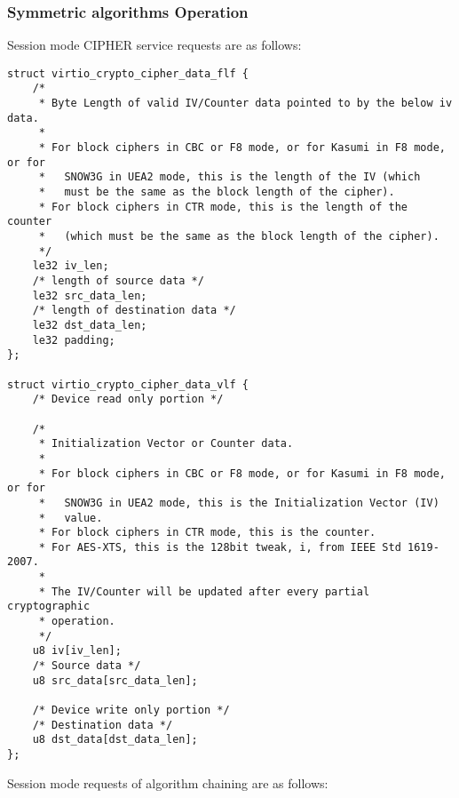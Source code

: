 \subsubsection{Symmetric algorithms Operation}\label{sec:Device Types / Crypto Device / Device Operation / Symmetric algorithms Operation}

Session mode CIPHER service requests are as follows:

\begin{lstlisting}
struct virtio_crypto_cipher_data_flf {
    /*
     * Byte Length of valid IV/Counter data pointed to by the below iv data.
     *
     * For block ciphers in CBC or F8 mode, or for Kasumi in F8 mode, or for
     *   SNOW3G in UEA2 mode, this is the length of the IV (which
     *   must be the same as the block length of the cipher).
     * For block ciphers in CTR mode, this is the length of the counter
     *   (which must be the same as the block length of the cipher).
     */
    le32 iv_len;
    /* length of source data */
    le32 src_data_len;
    /* length of destination data */
    le32 dst_data_len;
    le32 padding;
};

struct virtio_crypto_cipher_data_vlf {
    /* Device read only portion */

    /*
     * Initialization Vector or Counter data.
     *
     * For block ciphers in CBC or F8 mode, or for Kasumi in F8 mode, or for
     *   SNOW3G in UEA2 mode, this is the Initialization Vector (IV)
     *   value.
     * For block ciphers in CTR mode, this is the counter.
     * For AES-XTS, this is the 128bit tweak, i, from IEEE Std 1619-2007.
     *
     * The IV/Counter will be updated after every partial cryptographic
     * operation.
     */
    u8 iv[iv_len];
    /* Source data */
    u8 src_data[src_data_len];

    /* Device write only portion */
    /* Destination data */
    u8 dst_data[dst_data_len];
};
\end{lstlisting}

Session mode requests of algorithm chaining are as follows:

